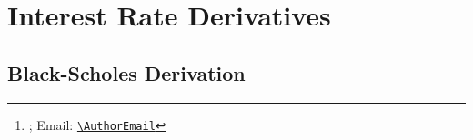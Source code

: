 \documentclass[11pt, a4paper, british]{article}
\title{\PaperTitle}
\author{%
    \AuthorName
    \thanks{\AuthorAffiliation; Email: \href{mailto:\AuthorEmail}{\nolinkurl{\AuthorEmail}}}
}
\date{\today}
\begin{document}
\maketitle
\begin{abstract}
    \noindent
    This is a \LaTeX\ writeup of my progression through a preponderance of alternative hedging strategies
\end{abstract}


\thispagestyle{empty}

\clearpage
\tableofcontents
\listoftables
\listofalgorithms
\thispagestyle{empty}
\clearpage


\section{Interest Rate Derivatives}

\newpage

\subsection{Black-Scholes Derivation}
\end{document}
